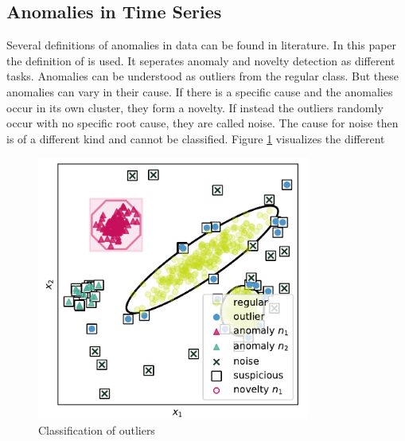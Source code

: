 \subsection{Anomalies in Time Series}
Several definitions of anomalies in data can be found in literature. In this paper the definition of \cite[p. 54]{gruhl_novelty_2022} is used. It seperates anomaly and novelty detection as different tasks. Anomalies can be understood as outliers from the regular class. But these anomalies can vary in their cause. If there is a specific cause and the anomalies occur in its own cluster, they form a novelty. If instead the outliers randomly occur with no specific root cause, they are called noise. The cause for noise then is of a different kind and cannot be classified. Figure \ref{fig_anomaly_gruhl} visualizes the different
\begin{figure}[h!] %
  \centering
  \includegraphics[width=0.8\textwidth]{images/gruhl_anomaly_definition.png}
  \caption{Classification of outliers \cite[p. 54]{gruhl_novelty_2022}}
  \label{fig_anomaly_gruhl}
\end{figure}

